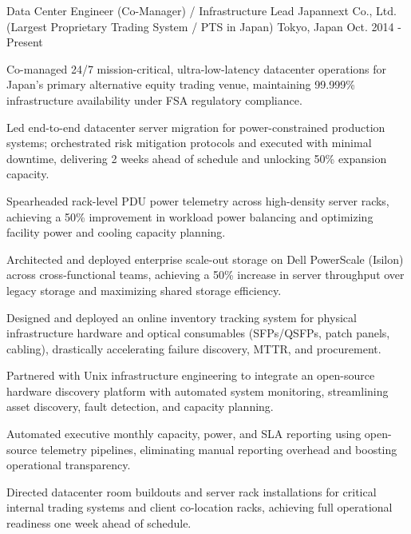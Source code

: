 

\begin{cventries}

  \cventry
    {Data Center Engineer (Co-Manager) / Infrastructure Lead} %
    {Japannext Co., Ltd. (Largest Proprietary Trading System / PTS in Japan)} %
    {Tokyo, Japan} %
    {Oct. 2014 - Present} %
    {
      \begin{cvitems} %
        \item {Co-managed 24/7 mission-critical, ultra-low-latency datacenter operations for Japan's primary alternative equity trading venue, maintaining 99.999\% infrastructure availability under FSA regulatory compliance.}
        \item {Led end-to-end datacenter server migration for power-constrained production systems; orchestrated risk mitigation protocols and executed with minimal downtime, delivering 2 weeks ahead of schedule and unlocking 50\% expansion capacity.}
        \item {Spearheaded rack-level PDU power telemetry across high-density server racks, achieving a 50\% improvement in workload power balancing and optimizing facility power and cooling capacity planning.}
        \item {Architected and deployed enterprise scale-out storage on Dell PowerScale (Isilon) across cross-functional teams, achieving a 50\% increase in server throughput over legacy storage and maximizing shared storage efficiency.}
        \item {Designed and deployed an online inventory tracking system for physical infrastructure hardware and optical consumables (SFPs/QSFPs, patch panels, cabling), drastically accelerating failure discovery, MTTR, and procurement.}
        \item {Partnered with Unix infrastructure engineering to integrate an open-source hardware discovery platform with automated system monitoring, streamlining asset discovery, fault detection, and capacity planning.}
        \item {Automated executive monthly capacity, power, and SLA reporting using open-source telemetry pipelines, eliminating manual reporting overhead and boosting operational transparency.}
        \item {Directed datacenter room buildouts and server rack installations for critical internal trading systems and client co-location racks, achieving full operational readiness one week ahead of schedule.}
      \end{cvitems}
    }


\end{cventries}
